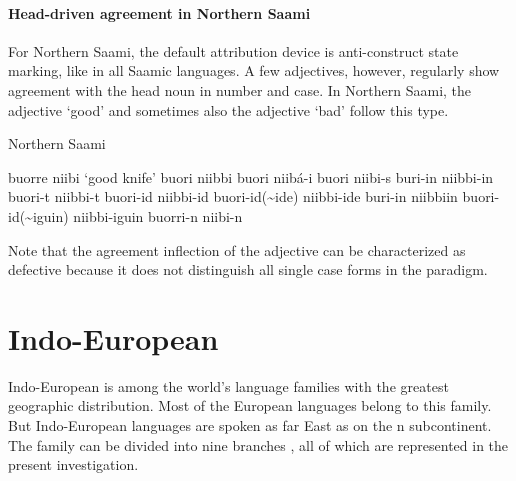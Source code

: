 \paragraph*{Head\hyp{}driven agreement in Northern Saami}
For Northern Saami, the default attribution device is anti\hyp{}construct state marking, like in all Saamic languages. A few adjectives, however, regularly show agreement with the head noun in number and case. In Northern Saami, the adjective ‘good’ and sometimes also the adjective ‘bad’ follow this type.
\begin{exe}
\settowidth{}
\ex \rm{Northern Saami \citep[83]{nickel1990}}
\begin{xlist}
\ex	buorre niibi						\rm{‘good knife’}	
\ex	buori niibbi										
\ex	buori niibá-i										
\ex	buori niibi-s										
\ex	buri-in niibbi-in										
\ex	buori-t niibbi-t										
\ex	buori-id niibbi-id									
\ex	buori-id(\textasciitilde ide) niibbi-ide						
\ex	buri-in niibbiin										
\ex	buori-id(\textasciitilde iguin) niibbi-iguin					
\ex	buorri-n niibi-n										
\end{xlist}
\end{exe}
Note that the agreement inflection of the adjective can be characterized as defective because it does not distinguish all single case forms in the paradigm.

\section{Indo-European}
Indo-European is among the world's language families with the greatest geographic distribution. Most of the European languages belong to this family. But Indo-European languages are spoken as far East as on the n subcontinent. The family can be divided into nine branches \citep[218]{salminen2007}, all of which are represented in the present investigation.

